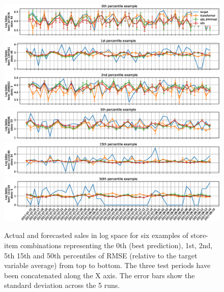 \documentclass{elsarticle}
\begin{document}
	
	\begin{figure}
		\centering
		\includegraphics[width=1\linewidth]{img/sample_0_log}
		\includegraphics[width=1\linewidth]{img/sample_1_log}
		\includegraphics[width=1\linewidth]{img/sample_2_log}
		\includegraphics[width=1\linewidth]{img/sample_3_log}
		\includegraphics[width=1\linewidth]{img/sample_4_log}
		\includegraphics[width=1\linewidth]{img/sample_5_log}
	\caption{Actual and forecasted sales in log space for six examples of store-item combinations representing the 0th (best prediction), 1st, 2nd, 5th 15th and 50th percentiles of RMSE (relative to the target variable average) from top to bottom. The three test periods have been concatenated along the X axis. The error bars show the standard deviation across the 5 runs.}
		\label{fig:ts_log}
	\end{figure}
\end{document}
